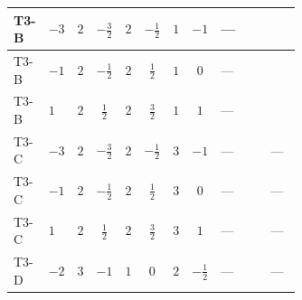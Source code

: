 \documentclass[8pt]{article}
\begin{document}
\begin{landscape}
\begin{longtable}{@{}llcccccc >{\raggedright\arraybackslash}p{0.21\linewidth} >{\raggedright\arraybackslash}p{0.21\linewidth} >{\raggedright\arraybackslash}p{0.21\linewidth}@{}}
\midrule
T3-B & $-3$ & $2$ & $-\frac{3}{2}$ & $2$ & $-\frac{1}{2}$ & $1$ & $-1$ & --- & \scriptsize\adjustbox{max width=\linewidth}{$\begin{gathered} +4 {\lambda_{12}^{(1)}} {m_1^2}\end{gathered}$} & \scriptsize\adjustbox{max width=\linewidth}{$\begin{gathered} {m_2^2} (2 T_{\nu}^{(2)}+6 {\lambda_{S_2}^{(1)}})\end{gathered}$} \\
\midrule
T3-B & $-1$ & $2$ & $-\frac{1}{2}$ & $2$ & $\frac{1}{2}$ & $1$ & $0$ & --- & \scriptsize\adjustbox{max width=\linewidth}{$\begin{gathered} +4 {\lambda_{12}^{(1)}} {m_1^2}\end{gathered}$} & \scriptsize\adjustbox{max width=\linewidth}{$\begin{gathered} {m_2^2} (2 T_{\nu}^{(2)}+6 {\lambda_{S_2}^{(1)}})\end{gathered}$} \\
\midrule
T3-B & $1$ & $2$ & $\frac{1}{2}$ & $2$ & $\frac{3}{2}$ & $1$ & $1$ & --- & \scriptsize\adjustbox{max width=\linewidth}{$\begin{gathered} +4 {\lambda_{12}^{(1)}} {m_1^2}\end{gathered}$} & \scriptsize\adjustbox{max width=\linewidth}{$\begin{gathered} {m_2^2} (2 T_{\nu}^{(2)}+6 {\lambda_{S_2}^{(1)}})\end{gathered}$} \\
\midrule
T3-C & $-3$ & $2$ & $-\frac{3}{2}$ & $2$ & $-\frac{1}{2}$ & $3$ & $-1$ & --- & \scriptsize\adjustbox{max width=\linewidth}{$\begin{gathered} +4 {\lambda_{12}^{(1)}} {m_1^2}\end{gathered}$} & --- \\
\midrule
T3-C & $-1$ & $2$ & $-\frac{1}{2}$ & $2$ & $\frac{1}{2}$ & $3$ & $0$ & --- & \scriptsize\adjustbox{max width=\linewidth}{$\begin{gathered} +4 {\lambda_{12}^{(1)}} {m_1^2}\end{gathered}$} & --- \\
\midrule
T3-C & $1$ & $2$ & $\frac{1}{2}$ & $2$ & $\frac{3}{2}$ & $3$ & $1$ & --- & \scriptsize\adjustbox{max width=\linewidth}{$\begin{gathered} +4 {\lambda_{12}^{(1)}} {m_1^2}\end{gathered}$} & --- \\
\midrule
T3-D & $-2$ & $3$ & $-1$ & $1$ & $0$ & $2$ & $-\frac{1}{2}$ & --- & \scriptsize\adjustbox{max width=\linewidth}{$\begin{gathered} +6 {\lambda_{12}^{(1)}} {m_1^2}\end{gathered}$} & --- \\

\end{longtable}
\end{landscape}
\end{document}
